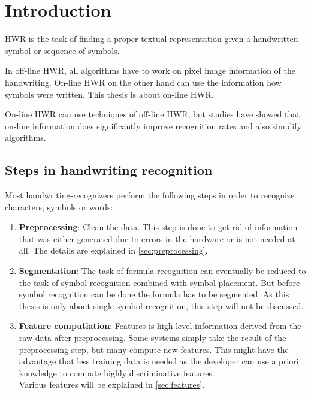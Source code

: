 \chapter{Introduction}\label{ch:Introduction}

\Gls{HWR} is the task of finding a proper textual representation
given a handwritten symbol or sequence of symbols.

In off-line \gls{HWR}, all algorithms have to work on pixel image
information of the handwriting. On-line \gls{HWR} on the other
hand can use the information how symbols were written. This thesis is about
on-line \gls{HWR}.

On-line \gls{HWR} can use techniques of off-line \gls{HWR}, but studies have
showed that on-line information does significantly improve recognition rates
and also simplify algorithms.\cite{Guyon91,Becker72}

\section{Steps in handwriting recognition}
Most handwriting-recognizers perform the following steps in order to recognize
characters, symbols or words:

\begin{enumerate}
    \item \textbf{Preprocessing}: Clean the data. This step is done to get rid
          of information that was either generated due to errors in the hardware %
          or is not needed at all. The details are explained in
          \cref{sec:preprocessing}.
    \item \textbf{Segmentation}: The task of formula recognition can eventually
          be reduced to the task of symbol recognition combined with symbol
          placement. But before symbol recognition can be done the formula has
          to be segmented. As this thesis %
          is only about single symbol recognition, this step will not be discussed.
    \item \textbf{Feature computiation}: Features is high-level information derived
          from the raw data after preprocessing. Some systems simply take the
          result of the preprocessing step, but many compute new features. This
          might have the advantage that less training data is needed as the
          developer can use a priori knowledge to compute highly discriminative
          features.\\
          Various features will be explained in \cref{sec:features}.
\end{enumerate}

